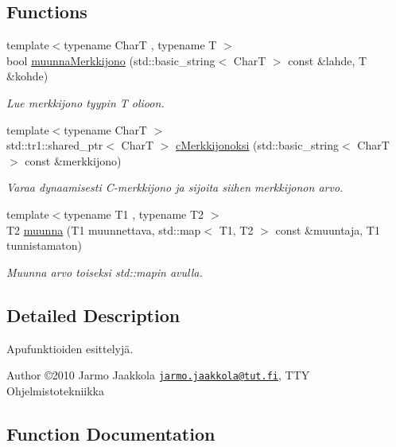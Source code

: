 \subsection*{Functions}
\begin{DoxyCompactItemize}
\item 
{\footnotesize template$<$typename Char\+T , typename T $>$ }\\bool \hyperlink{hyodykkeet_8hh_acb3ccef14aa9c4a9e71e4eb4eaf7e1cf}{muunna\+Merkkijono} (std\+::basic\+\_\+string$<$ Char\+T $>$ const \&lahde, T \&kohde)
\begin{DoxyCompactList}\small\item\em Lue merkkijono tyypin T olioon. \end{DoxyCompactList}\item 
{\footnotesize template$<$typename Char\+T $>$ }\\std\+::tr1\+::shared\+\_\+ptr$<$ Char\+T $>$ \hyperlink{hyodykkeet_8hh_a861c5d6d3983229a4215095837e481eb}{c\+Merkkijonoksi} (std\+::basic\+\_\+string$<$ Char\+T $>$ const \&merkkijono)
\begin{DoxyCompactList}\small\item\em Varaa dynaamisesti C-\/merkkijono ja sijoita siihen merkkijonon arvo. \end{DoxyCompactList}\item 
{\footnotesize template$<$typename T1 , typename T2 $>$ }\\T2 \hyperlink{hyodykkeet_8hh_ac8ec0c03c0ca6f3f93b88118264d289a}{muunna} (T1 muunnettava, std\+::map$<$ T1, T2 $>$ const \&muuntaja, T1 tunnistamaton)
\begin{DoxyCompactList}\small\item\em Muunna arvo toiseksi std\+::mapin avulla. \end{DoxyCompactList}\end{DoxyCompactItemize}


\subsection{Detailed Description}
Apufunktioiden esittelyjä. 

\begin{DoxyAuthor}{Author}
©2010 Jarmo Jaakkola \href{mailto:jarmo.jaakkola@tut.fi}{\tt jarmo.\+jaakkola@tut.\+fi}, T\+T\+Y Ohjelmistotekniikka 
\end{DoxyAuthor}


\subsection{Function Documentation}
\hypertarget{hyodykkeet_8hh_a861c5d6d3983229a4215095837e481eb}{}
